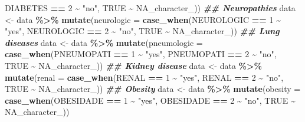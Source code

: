 \documentclass[
]{article}
\newenvironment{Shaded}{\begin{snugshade}}{\end{snugshade}}
\newcommand{\AttributeTok}[1]{\textcolor[rgb]{0.13,0.29,0.53}{#1}}
\newcommand{\ConstantTok}[1]{\textcolor[rgb]{0.56,0.35,0.01}{#1}}
\newcommand{\DecValTok}[1]{\textcolor[rgb]{0.00,0.00,0.81}{#1}}
\newcommand{\DocumentationTok}[1]{\textcolor[rgb]{0.56,0.35,0.01}{\textbf{\textit{#1}}}}
\newcommand{\FunctionTok}[1]{\textcolor[rgb]{0.13,0.29,0.53}{\textbf{#1}}}
\newcommand{\NormalTok}[1]{#1}
\newcommand{\OtherTok}[1]{\textcolor[rgb]{0.56,0.35,0.01}{#1}}
\newcommand{\SpecialCharTok}[1]{\textcolor[rgb]{0.81,0.36,0.00}{\textbf{#1}}}
\newcommand{\StringTok}[1]{\textcolor[rgb]{0.31,0.60,0.02}{#1}}
\begin{document}
\begin{Shaded}
\begin{Highlighting}[]
\NormalTok{                            DIABETES }\SpecialCharTok{==} \DecValTok{2} \SpecialCharTok{\textasciitilde{}} \StringTok{"no"}\NormalTok{, }
                            \ConstantTok{TRUE} \SpecialCharTok{\textasciitilde{}} \ConstantTok{NA\_character\_}\NormalTok{))}
\DocumentationTok{\#\# Neuropathies}
\NormalTok{data }\OtherTok{\textless{}{-}}\NormalTok{  data }\SpecialCharTok{\%\textgreater{}\%}
\FunctionTok{mutate}\NormalTok{(}\AttributeTok{neurologic =} \FunctionTok{case\_when}\NormalTok{(NEUROLOGIC }\SpecialCharTok{==} \DecValTok{1} \SpecialCharTok{\textasciitilde{}} \StringTok{"yes"}\NormalTok{,}
\NormalTok{                              NEUROLOGIC }\SpecialCharTok{==} \DecValTok{2} \SpecialCharTok{\textasciitilde{}} \StringTok{"no"}\NormalTok{, }
                              \ConstantTok{TRUE} \SpecialCharTok{\textasciitilde{}} \ConstantTok{NA\_character\_}\NormalTok{))}
\DocumentationTok{\#\# Lung diseases}
\NormalTok{data }\OtherTok{\textless{}{-}}\NormalTok{  data }\SpecialCharTok{\%\textgreater{}\%}
\FunctionTok{mutate}\NormalTok{(}\AttributeTok{pneumologic =} \FunctionTok{case\_when}\NormalTok{(PNEUMOPATI }\SpecialCharTok{==} \DecValTok{1} \SpecialCharTok{\textasciitilde{}} \StringTok{"yes"}\NormalTok{,}
\NormalTok{                              PNEUMOPATI }\SpecialCharTok{==} \DecValTok{2} \SpecialCharTok{\textasciitilde{}} \StringTok{"no"}\NormalTok{, }
                              \ConstantTok{TRUE} \SpecialCharTok{\textasciitilde{}} \ConstantTok{NA\_character\_}\NormalTok{))}
\DocumentationTok{\#\# Kidney disease}
\NormalTok{data }\OtherTok{\textless{}{-}}\NormalTok{  data }\SpecialCharTok{\%\textgreater{}\%}
\FunctionTok{mutate}\NormalTok{(}\AttributeTok{renal =} \FunctionTok{case\_when}\NormalTok{(RENAL }\SpecialCharTok{==} \DecValTok{1} \SpecialCharTok{\textasciitilde{}} \StringTok{"yes"}\NormalTok{,}
\NormalTok{                         RENAL }\SpecialCharTok{==} \DecValTok{2} \SpecialCharTok{\textasciitilde{}} \StringTok{"no"}\NormalTok{, }
                         \ConstantTok{TRUE} \SpecialCharTok{\textasciitilde{}} \ConstantTok{NA\_character\_}\NormalTok{))}
\DocumentationTok{\#\# Obesity}
\NormalTok{data }\OtherTok{\textless{}{-}}\NormalTok{  data }\SpecialCharTok{\%\textgreater{}\%}
\FunctionTok{mutate}\NormalTok{(}\AttributeTok{obesity =} \FunctionTok{case\_when}\NormalTok{(OBESIDADE }\SpecialCharTok{==} \DecValTok{1} \SpecialCharTok{\textasciitilde{}} \StringTok{"yes"}\NormalTok{,}
\NormalTok{                              OBESIDADE }\SpecialCharTok{==} \DecValTok{2} \SpecialCharTok{\textasciitilde{}} \StringTok{"no"}\NormalTok{, }
                              \ConstantTok{TRUE} \SpecialCharTok{\textasciitilde{}} \ConstantTok{NA\_character\_}\NormalTok{))}


\end{Highlighting}
\end{Shaded}
\end{document}
